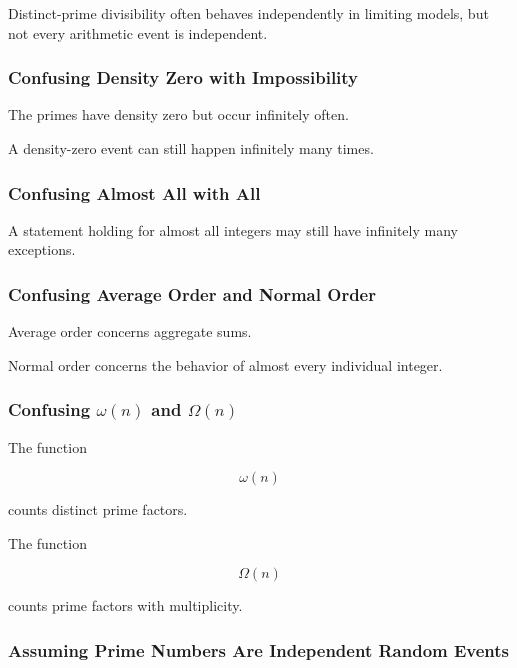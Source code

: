 Distinct-prime divisibility often behaves independently in limiting models,
but not every arithmetic event is independent.

\subsubsection{Confusing Density Zero with Impossibility}

The primes have density zero but occur infinitely often.

A density-zero event can still happen infinitely many times.

\subsubsection{Confusing Almost All with All}

A statement holding for almost all integers may still have infinitely many
exceptions.

\subsubsection{Confusing Average Order and Normal Order}

Average order concerns aggregate sums.

Normal order concerns the behavior of almost every individual integer.

\subsubsection{Confusing \(\omega(n)\) and \(\Omega(n)\)}

The function

\[ \omega(n) \]

counts distinct prime factors.

The function

\[ \Omega(n) \]

counts prime factors with multiplicity.

\subsubsection{Assuming Prime Numbers Are Independent Random Events}

